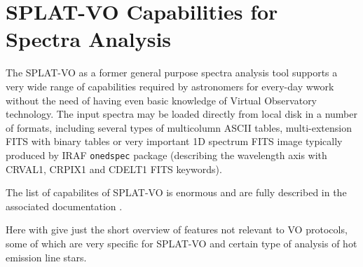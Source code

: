 \documentclass[final,authoryear,5p,times,twocolumn]{elsarticle}
\begin{document}
\section{SPLAT-VO Capabilities  for Spectra Analysis}

The SPLAT-VO as a former general purpose spectra analysis tool supports a very
wide range of capabilities required by astronomers for every-day wwork without
the need of having even basic knowledge of Virtual Observatory technology. The
input spectra may be loaded directly from local disk in a number of formats,
including several types of multicolumn ASCII tables, multi-extension FITS with
binary tables or very important 1D spectrum FITS image typically produced by
IRAF {\tt onedspec} package (describing the wavelength axis with CRVAL1, CRPIX1
and CDELT1 FITS keywords).

The list of capabilites of SPLAT-VO is enormous and are fully described in
the associated documentation \citep[SUN/243;][]{sun243}.

Here with give just the short overview of features not relevant to VO
protocols, some of which are very
specific for SPLAT-VO and certain type of analysis of hot emission line stars.
\end{document}
